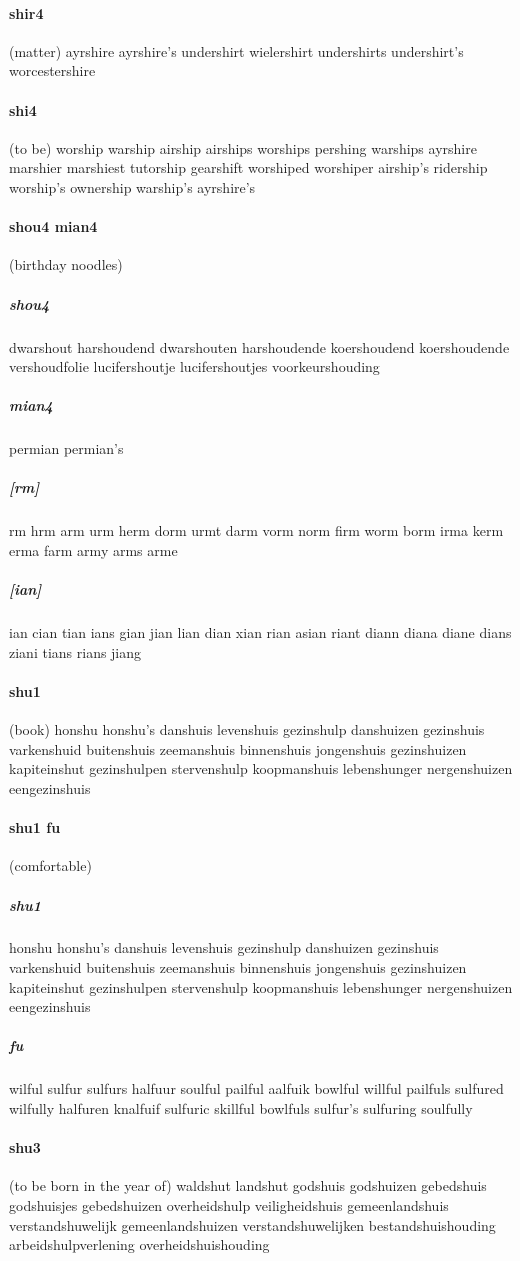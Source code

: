 \documentclass{article}
\begin{document}
\paragraph{shir4}(matter) ayrshire
ayrshire's
undershirt
wielershirt
undershirts
undershirt's
worcestershire
\paragraph{shi4}(to be) worship
warship
airship
airships
worships
pershing
warships
ayrshire
marshier
marshiest
tutorship
gearshift
worshiped
worshiper
airship's
ridership
worship's
ownership
warship's
ayrshire's
\paragraph{shou4 mian4}(birthday noodles) \subparagraph{shou4}dwarshout
harshoudend
dwarshouten
harshoudende
koershoudend
koershoudende
vershoudfolie
lucifershoutje
lucifershoutjes
voorkeurshouding
\subparagraph{mian4}permian
permian's
\subparagraph{[rm]}rm
hrm
arm
urm
herm
dorm
urmt
darm
vorm
norm
firm
worm
borm
irma
kerm
erma
farm
army
arms
arme
\subparagraph{[ian]}ian
cian
tian
ians
gian
jian
lian
dian
xian
rian
asian
riant
diann
diana
diane
dians
ziani
tians
rians
jiang
\paragraph{shu1}(book) honshu
honshu's
danshuis
levenshuis
gezinshulp
danshuizen
gezinshuis
varkenshuid
buitenshuis
zeemanshuis
binnenshuis
jongenshuis
gezinshuizen
kapiteinshut
gezinshulpen
stervenshulp
koopmanshuis
lebenshunger
nergenshuizen
eengezinshuis
\paragraph{shu1 fu}(comfortable) \subparagraph{shu1}honshu
honshu's
danshuis
levenshuis
gezinshulp
danshuizen
gezinshuis
varkenshuid
buitenshuis
zeemanshuis
binnenshuis
jongenshuis
gezinshuizen
kapiteinshut
gezinshulpen
stervenshulp
koopmanshuis
lebenshunger
nergenshuizen
eengezinshuis
\subparagraph{fu}wilful
sulfur
sulfurs
halfuur
soulful
pailful
aalfuik
bowlful
willful
pailfuls
sulfured
wilfully
halfuren
knalfuif
sulfuric
skillful
bowlfuls
sulfur's
sulfuring
soulfully
\paragraph{shu3}(to be born in the year of) waldshut
landshut
godshuis
godshuizen
gebedshuis
godshuisjes
gebedshuizen
overheidshulp
veiligheidshuis
gemeenlandshuis
verstandshuwelijk
gemeenlandshuizen
verstandshuwelijken
bestandshuishouding
arbeidshulpverlening
overheidshuishouding
\end{document}
